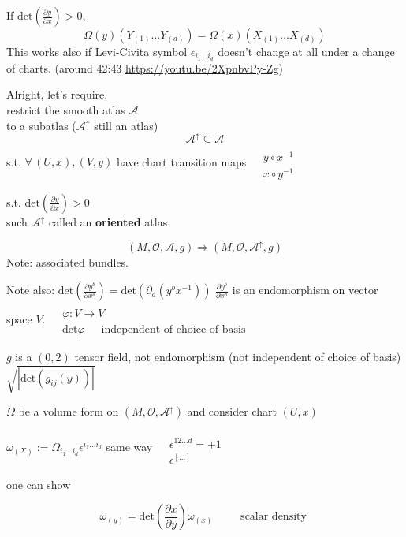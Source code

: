 If $\text{det}\left( \frac{ \partial y}{ \partial x} \right) > 0$, 
\[
\Omega(y)(Y_{(1)} \dots Y_{(d)})  = \Omega(x)(X_{(1)} \dots X_{(d)} )
\]
This works also if Levi-Civita symbol $\epsilon_{i_1\dots i_d}$ doesn't change at all under a change of charts. (around 42:43 \url{https://youtu.be/2XpnbvPy-Zg})

\hrulefill

Alright, let's require, \\
\phantom{\quad \, } restrict the smooth atlas $\mathcal{A}$ \\
\phantom{\quad \quad \, } to a subatlas ($\mathcal{A}^{\uparrow}$ still an atlas) 
\[
\mathcal{A}^{\uparrow} \subseteq \mathcal{A}
\]
s.t. $\forall \, (U,x), (V,y)$ have chart transition maps $\begin{aligned} & \quad \\ 
& y\circ x^{-1} \\ 
& x\circ y^{-1} \end{aligned}$

s.t. $\text{det}\left( \frac{ \partial y}{ \partial x} \right) >0$  \\
\phantom{ \quad \, } such $\mathcal{A}^{\uparrow} $ called an \textbf{oriented} atlas 

\[
(M, \mathcal{O}, \mathcal{A},g) \Longrightarrow (M,\mathcal{O},\mathcal{A}^{\uparrow} ,g)
\]
Note: associated bundles.

Note also:
$ \text{det}\left( \frac{ \partial y^b}{ \partial x^a} \right) = \text{det}(\partial_a(y^bx^{-1}))$ \phantom{ \quad \quad \, } $\frac{ \partial y^b}{ \partial x^a}$ is an endomorphism on vector space $V$.  $\begin{aligned} & \quad \\ 
& \varphi : V \to V \\
& \text{det}\varphi \quad \, \text{ independent of choice of basis } \end{aligned}$

\phantom{\quad \quad \, } $g$ is a $(0,2)$ tensor field, not endomorphism (not independent of choice of basis) $\sqrt{ |\text{det}(g_{ij}(y)) | }$

\begin{definition} $\Omega$ be a volume form on $(M,\mathcal{O}, \mathcal{A}^{\uparrow} )$ and consider chart $(U,x)$ 
\begin{definition} $\omega_{(X)} := \Omega_{i_1\dots i_d} \epsilon^{i_1\dots i_d}$
same way $\begin{aligned} & \quad \\ 
& \epsilon^{12 \dots d} = +1 \\ 
& \epsilon^{[\dots ]} \end{aligned}$

one can show

\[
\boxed{ \omega_{(y)} = \text{det}\left( \frac{ \partial x}{ \partial y} \right) \omega_{(x)} } \quad \quad \, \text{ scalar density }
\]
\end{definition}
\end{definition}

